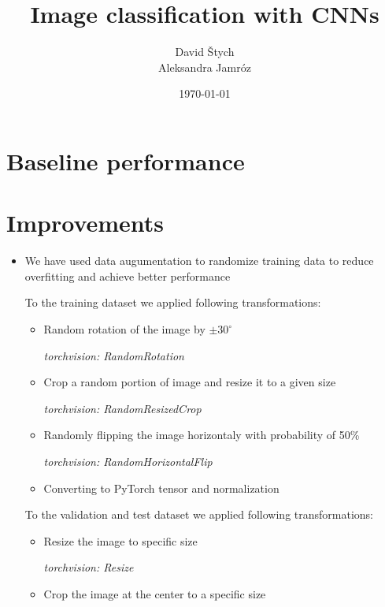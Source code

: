\documentclass{article}
\title{Image classification with CNNs}
\author{David Štych\\ Aleksandra Jamróz}
\date{\today{}}
\begin{document}
\maketitle
\newpage


\section*{Baseline performance}


\section*{Improvements}

\begin{itemize}
\item We have used data augumentation to randomize training data to reduce overfitting and achieve better performance \cite{somewebsite}

To the training dataset we applied following transformations: 
\begin{itemize}
\item Random rotation of the image by $\pm30^{\circ}$

\textit{torchvision: RandomRotation}
\item Crop a random portion of image and resize it to a given size

\textit{torchvision: RandomResizedCrop}\cite{randomresizedcrop}
\item Randomly flipping the image horizontaly with probability of 50\%

\textit{torchvision: RandomHorizontalFlip}\cite{randomhorizontalflip}
\item Converting to PyTorch tensor and normalization
\end{itemize} 
To the validation and test dataset we applied following transformations: 
\begin{itemize}
\item Resize the image to specific size

\textit{torchvision: Resize}\cite{resize}
\item Crop the image at the center to a specific size


\end{itemize}
\end{itemize}
\end{document}
